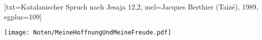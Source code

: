 [txt={Katalanischer Spruch nach Jesaja 12,2}, mel={Jacques Berthier (Taizé), 1989}, egplus={109}]

\beginverse
\endverse
\texttt{[image: Noten/MeineHoffnungUndMeineFreude.pdf]}

\endsong